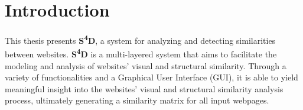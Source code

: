 \chapter{Introduction}
\label{ch:introduction}

This thesis presents \textlatin{\textbf{S\textsuperscript{4}D}}, a system for analyzing and detecting similarities between websites. \textlatin{\textbf{S\textsuperscript{4}D}} is a multi-layered system that aims to facilitate the modeling and analysis of websites' visual and structural similarity. Through a variety of functionalities and a Graphical User Interface (GUI), it is able to yield meaningful insight into the websites' visual and structural similarity analysis process, ultimately generating a similarity matrix for all input webpages.






